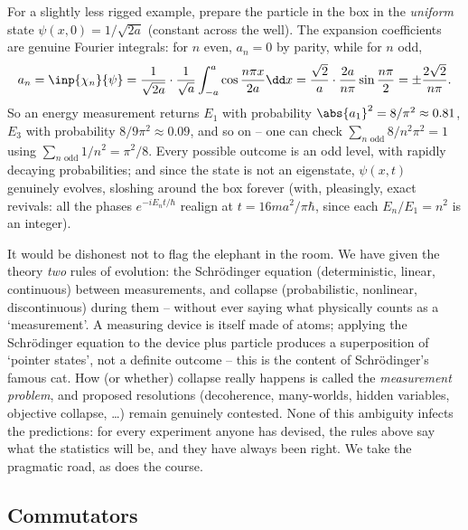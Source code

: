 \begin{example}
    For a slightly less rigged example, prepare the particle in the box in the \emph{uniform} state $\psi(x, 0) = 1/\sqrt{2a}$ (constant across the well). The expansion coefficients are genuine Fourier integrals: for $n$ even, $a_n = 0$ by parity, while for $n$ odd,
    $$
    a_n = \inp{\chi_n}{\psi} = \frac{1}{\sqrt{2a}} \cdot \frac{1}{\sqrt{a}} \int_{-a}^{a} \cos \frac{n \pi x}{2a} \dd x = \frac{\sqrt{2}}{a} \cdot \frac{2a}{n \pi} \sin \frac{n \pi}{2} = \pm\frac{2 \sqrt{2}}{n \pi}.
    $$
    So an energy measurement returns $E_1$ with probability $\abs{a_1}^2 = 8/\pi^2 \approx 0.81$, $E_3$ with probability $8/9\pi^2 \approx 0.09$, and so on -- one can check $\sum_{n \text{ odd}} 8/n^2\pi^2 = 1$ using $\sum_{n \text{ odd}} 1/n^2 = \pi^2/8$. Every possible outcome is an odd level, with rapidly decaying probabilities; and since the state is not an eigenstate, $\psi(x, t)$ genuinely evolves, sloshing around the box forever (with, pleasingly, exact revivals: all the phases $e^{-iE_n t/\hbar}$ realign at $t = 16ma^2/\pi\hbar$, since each $E_n/E_1 = n^2$ is an integer).
\end{example}

\begin{remark}
    It would be dishonest not to flag the elephant in the room. We have given the theory \emph{two} rules of evolution: the Schr\"odinger equation (deterministic, linear, continuous) between measurements, and collapse (probabilistic, nonlinear, discontinuous) during them -- without ever saying what physically counts as a `measurement'. A measuring device is itself made of atoms; applying the Schr\"odinger equation to the device plus particle produces a superposition of `pointer states', not a definite outcome -- this is the content of Schr\"odinger's famous cat. How (or whether) collapse really happens is called the \emph{measurement problem}, and proposed resolutions (decoherence, many-worlds, hidden variables, objective collapse, \dots) remain genuinely contested. None of this ambiguity infects the predictions: for every experiment anyone has devised, the rules above say what the statistics will be, and they have always been right. We take the pragmatic road, as does the course.
\end{remark}

\subsection{Commutators}

